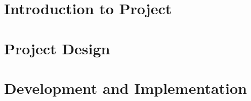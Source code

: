 \documentclass[12pt]{report}
\begin{document}




\footskip 0.7cm
\thispagestyle{empty} 
\pagetitle
\newpage
{}
\cfoot{\thepage}



\newpage
\tableofcontents
\newpage
\listoffigures
\newpage

\cfoot{\thepage}

\newpage

\chapter{Introduction to Project}

\chapter{Project Design}


\chapter{Development and Implementation}

\end{document}
